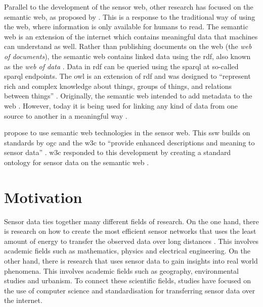 Parallel to the development of the sensor web, other research has focused on the semantic web, as proposed by \cite{LD:Berners-lee}. This is a response to the traditional way of using the web, where information is only available for humans to read. The semantic web is an extension of the internet which contains meaningful data that machines can understand as well. Rather than publishing documents on the web (the \textit{web of documents}), the semantic web contains linked data using the \ac{rdf}, also known as the \textit{web of data} \citep{LD:Bizer}. Data in \ac{rdf} can be queried using the \ac{sparql} at so-called \ac{sparql} endpoints. The \ac{owl} is an extension of \ac{rdf} and was designed to \enquote{represent rich and complex knowledge about things, groups of things, and relations between things} \citep{LD:OWL}. Originally, the semantic web intended to add metadata to the web \citep{LD:W3C}. However, today it is being used for linking any kind of data from one source to another in a meaningful way \citep{LD:Cambridge}. 

\cite{SSW:Sheth} propose to use semantic web technologies in the sensor web. This \ac{ssw} builds on standards by \ac{ogc} and the \ac{w3c} to \enquote{provide enhanced descriptions and meaning to sensor data} \cite[p. 78]{SSW:Sheth}. \ac{w3c} responded to this development by creating a standard ontology for sensor data on the semantic web \citep{SSW:SSN_incubatorGroup}. 


\section{Motivation}
Sensor data ties together many different fields of research. On the one hand, there is research on how to create the most efficient sensor networks that uses the least amount of energy to transfer the observed data over long distances \citep{SW:Korteweg,SW:Xiang}. This involves academic fields such as mathematics, physics and electrical engineering. On the other hand, there is research that uses sensor data to gain insights into real world phenomena. This involves academic fields such as geography, environmental studies and urbanism. To connect these scientific fields, studies have focused on the use of computer science and standardisation for transferring sensor data over the internet. 

